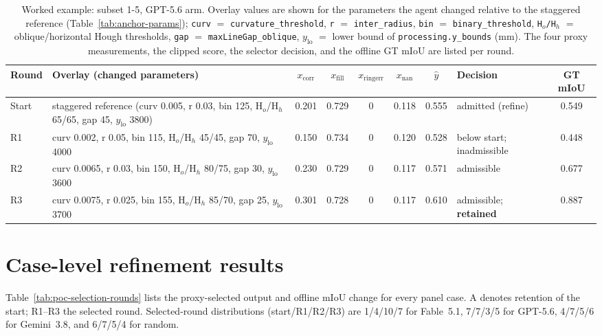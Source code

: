 \documentclass[a4paper,fleqn]{cas-dc}
\begin{document}
\begin{table}[t]
\caption{Worked example: subset 1-5, GPT-5.6 arm. Overlay values are shown for the parameters the agent changed relative to the staggered reference (Table~\ref{tab:anchor-params}); \texttt{curv} $=$ \texttt{curvature\_threshold}, \texttt{r} $=$ \texttt{inter\_radius}, \texttt{bin} $=$ \texttt{binary\_threshold}, \texttt{H$_{o}$/H$_{h}$} $=$ oblique/horizontal Hough thresholds, \texttt{gap} $=$ \texttt{maxLineGap\_oblique}, $y_{\mathrm{lo}}$ $=$ lower bound of \texttt{processing.y\_bounds} (mm). The four proxy measurements, the clipped score, the selector decision, and the offline GT mIoU are listed per round.}
\label{tab:worked-example}
\centering
\footnotesize
\setlength{\tabcolsep}{3.5pt}
\begin{tabular}{l Y{0.36\textwidth} c c c c c Y{0.13\textwidth} c}
\toprule
Round & Overlay (changed parameters) & $x_{\mathrm{corr}}$ & $x_{\mathrm{fill}}$ & $x_{\mathrm{ringerr}}$ & $x_{\mathrm{nan}}$ & $\hat y$ & Decision & GT mIoU \\
\midrule
Start & staggered reference (curv 0.005, r 0.03, bin 125, H$_o$/H$_h$ 65/65, gap 45, $y_{\mathrm{lo}}$ 3800) & 0.201 & 0.729 & 0 & 0.118 & 0.555 & admitted (refine) & 0.549 \\
R1 & curv 0.002, r 0.05, bin 115, H$_o$/H$_h$ 45/45, gap 70, $y_{\mathrm{lo}}$ 4000 & 0.150 & 0.734 & 0 & 0.120 & 0.528 & below start; inadmissible & 0.448 \\
R2 & curv 0.0065, r 0.03, bin 150, H$_o$/H$_h$ 80/75, gap 30, $y_{\mathrm{lo}}$ 3600 & 0.230 & 0.729 & 0 & 0.117 & 0.571 & admissible & 0.677 \\
R3 & curv 0.0075, r 0.025, bin 155, H$_o$/H$_h$ 85/70, gap 25, $y_{\mathrm{lo}}$ 3700 & 0.301 & 0.728 & 0 & 0.117 & 0.610 & admissible; \textbf{retained} & 0.887 \\
\bottomrule
\end{tabular}
\end{table}

\section{Case-level refinement results}\label{app:poc-selection}

Table~\ref{tab:poc-selection-rounds} lists the proxy-selected output and offline mIoU change for every panel case. A denotes retention of the start; R1--R3 the selected round. Selected-round distributions (start/R1/R2/R3) are 1/4/10/7 for Fable~5.1, 7/7/3/5 for GPT-5.6, 4/7/5/6 for Gemini~3.8, and 6/7/5/4 for random.
\end{document}
